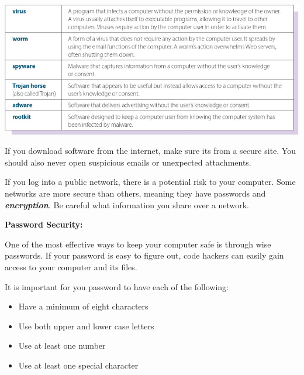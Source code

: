 \documentclass{report}
\begin{document}
    \bigbreak \noindent 

    \bigbreak \noindent 
    \begin{center}
       \includegraphics[scale=0.6]{ ./images/virus.png } 
    \end{center}

    \bigbreak \noindent 
    If you download software from the internet, make sure its from a secure site.
    You should also never open suspicious emails or unexpected attachments.

    \bigbreak \noindent 
    If you log into a public network, there is a potential risk to your computer. 
    Some networks are more secure than others, meaning they have passwords and \textbf{ \textit{encryption}}.
    Be careful what information you share over a network.
    
    \bigbreak \noindent 

    \bigbreak \noindent \bigbreak \noindent \bigbreak \noindent 
    \begin{Large}
        \textbf{Password Security:}
    \end{Large}
    
    \bigbreak \noindent 
    One of the most effective ways to keep your computer safe is through wise passwords. 
    If your password is easy to figure out, code hackers can easily gain access to
    your computer and its files. 

    \bigbreak \noindent 
    It is important for you password to have each of the following:

    \bigbreak \noindent 
    \begin{itemize}
        \item Have a minimum of eight characters
        \item Use both upper and lower case letters
        \item Use at least one number
        \item Use at least one special character
    \end{itemize}
\end{document}
